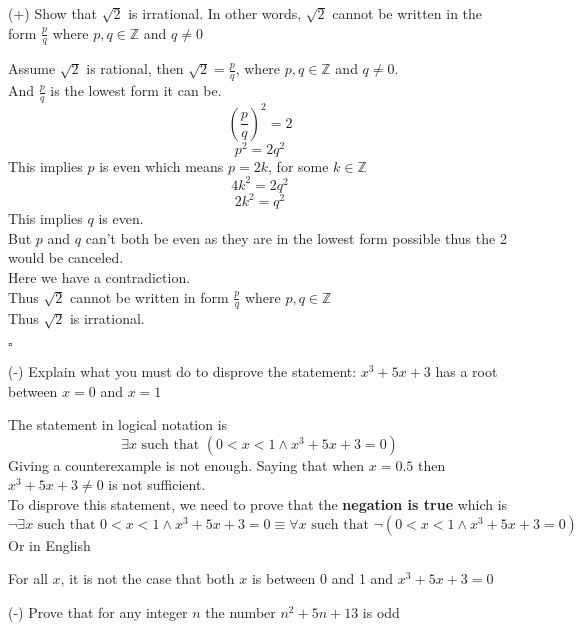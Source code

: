 \documentclass{exam}
\begin{document}
\begin{questions}
    \question (+) Show that $\sqrt{2}$ is irrational. In other words, $\sqrt{2}$ cannot be written in the form $\frac{p}{q}$ where $p,q \in \mathbb{Z}$ and $q \neq 0$
    \begin{solution}
        Assume $\sqrt{2}$ is rational, then $\sqrt{2} = \frac{p}{q}$, where $p,q \in \mathbb{Z}$ and $q \neq 0$.
        \\And $\frac{p}{q}$ is the lowest form it can be. 
        $$\left(\frac{p}{q}\right)^2 = 2$$
        $$p^2 = 2 q^2$$
        This implies $p$ is even which means $p = 2k$, for some $k \in \mathbb{Z}$
        $$4k^2 = 2 q^2$$
        $$2k^2 = q^2$$
        This implies $q$ is even.
        \\But $p$ and $q$ can't both be even as they are in the lowest form possible thus the 2 would be canceled. 
        \\Here we have a contradiction.
        \\Thus $\sqrt{2}$ cannot be written in form $\frac{p}{q}$ where $p,q \in \mathbb{Z}$
        \\Thus $\sqrt{2}$ is irrational.
        \begin{flushright}
            $\square$
        \end{flushright}
    \end{solution}

    


\question (-) Explain what you must do to disprove the statement:
  $x^3+5x + 3$ has a root between $x = 0$ and $x=1$
  \begin{solution}
  The statement in logical notation is 
  $$\exists x \text{ such that } (0<x<1 \land x^3+5x+3 = 0)$$
  Giving a counterexample is not enough. Saying that when $x=0.5$ then $x^3 +5x+3 \neq 0$ is not sufficient. \\
  To disprove this statement, we need to prove that the \textbf{negation is true} which is
  $$\neg \exists x \text{ such that } 0<x<1 \land x^3+5x+3 = 0 \equiv \forall x \text{ such that } \neg(0<x<1 \land x^3+5x+3 = 0)$$
  Or in English
  \begin{center}
      For all $x$, it is not the case that both $x$ is between 0 and 1 and $x^3+5x+3=0$
  \end{center}
      \end{solution}

\question (-) Prove that for any integer $n$ the number $n^2+5n+13$ is odd
\begin{solution}


\end{solution}
\end{questions}
\end{document}
